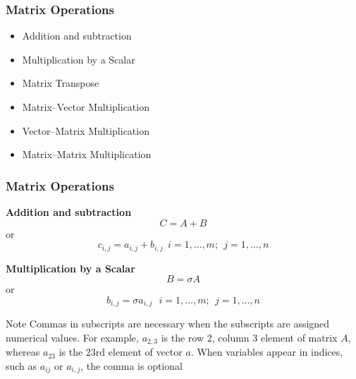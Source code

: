 \documentclass[10pt]{beamer}
\begin{document}
\begin{frame}
\frametitle{Matrix Operations}

\begin{itemize}
    \item   Addition and subtraction
    \item   Multiplication by a Scalar
    \item   Matrix Transpose
    \item   Matrix--Vector Multiplication
    \item   Vector--Matrix Multiplication
    \item   Matrix--Matrix Multiplication
\end{itemize}

\end{frame}
\begin{frame}
\frametitle{Matrix Operations}

\textbf{Addition and subtraction}
\begin{equation*}
    C = A + B
\end{equation*}
or
\begin{equation*}
    c_{i,j} = a_{i,j} + b_{i,j}\ \ i = 1,\ldots,m;\ \ j = 1,\ldots, n
\end{equation*}

\vspace{2ex}

\textbf{Multiplication by a Scalar}
\begin{equation*}
    B = \sigma A
\end{equation*}
or
\begin{equation*}
    b_{i,j} = \sigma a_{i,j}\ \ \ i = 1,\ldots,m;\ \ j = 1,\ldots, n
\end{equation*}

\begin{block}{Note}
    Commas in subscripts are necessary when the subscripts are assigned numerical
    values.  For example, $a_{2,3}$ is the row 2, column 3 element of matrix $A$,
    whereas $a_{23}$ is the $23\mathrm{rd}$ element of vector $a$.  When variables
    appear in indices, such as $a_{ij}$ or $a_{i,j}$, the comma is optional
\end{block}


\end{frame}
\end{document}
